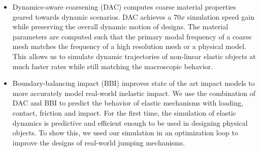\begin{itemize}
	\item Dynamics-aware coarsening (DAC) computes coarse material properties geared towards dynamic scenarios.
	DAC achieves a $70x$ simulation speed gain while preserving the overall dynamic motion of designs.
	The material parameters are computed such that the primary modal frequency
	of a coarse mesh matches the frequency of a high resolution mesh or a physical model.
	This allows us to simulate dynamic trajectories of non-linear elastic objects at much faster rates while still matching the macroscopic behavior.
	\item Boundary-balancing impact (BBI) improves state of the art impact models to more accurately model real-world inelastic impact.
	We use the combination of DAC and BBI to predict the behavior of elastic mechanisms with loading, contact, friction and impact.
	For the first time, the simulation of elastic dynamics is predictive and efficient enough to be used in designing physical objects.
	To show this, we used our simulation in an optimization loop to improve the designs of real-world jumping mechanisms.	
\end{itemize}